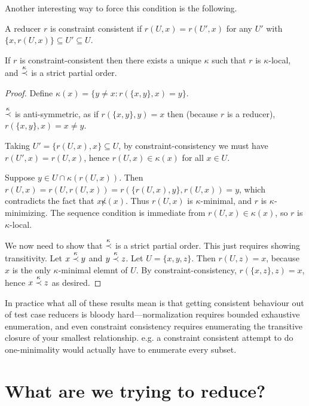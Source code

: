 Another interesting way to force this condition is the following.

\begin{definition}
A reducer \(r\) is constraint consistent if \(r(U, x) = r(U', x)\) for any \(U'\) with \(\{x, r(U, x)\} \subseteq U' \subseteq U\).
\end{definition}

\begin{theorem}
If \(r\) is constraint-consistent then there exists a unique \(\kappa\) such that \(r\) is \(\kappa\)-local,
and \(\stackrel{\kappa}{\prec}\) is a strict partial order.
\end{theorem}

\begin{proof}
Define \(\kappa(x) = \{y \neq x: r(\{x, y\}, x) = y\}\).

\(\stackrel{\kappa}{\prec}\) is anti-symmetric,
as if \(r(\{x, y\}, y) = x\) then (because \(r\) is a reducer),
\(r(\{x, y\}, x) = x \neq y\).

Taking \(U' = \{r(U, x), x\} \subseteq U\),
by constraint-consistency we must have \(r(U', x) = r(U, x)\),
hence \(r(U, x) \in \kappa(x)\) for all \(x \in U\).

Suppose \(y \in U \cap \kappa(r(U, x))\).
Then \(r(U, x) = r(U, r(U, x)) = r(\{r(U, x), y\}, r(U, x)) = y\),
which contradicts the fact that \(x \not \kappa(x)\).
Thus \(r(U, x)\) is \(\kappa\)-minimal,
and \(r\) is \(\kappa\)-minimizing.
The sequence condition is immediate from \(r(U, x) \in \kappa(x)\),
so \(r\) is \(\kappa\)-local.

We now need to show that \(\stackrel{\kappa}{\prec}\) is a strict partial order.
This just requires showing transitivity.
Let \(x \stackrel{\kappa}{\prec} y\) and \(y \stackrel{\kappa}{\prec} z\).
Let \(U = \{x, y, z\}\).
Then \(r(U, z) = x\), because \(x\) is the only \(\kappa\)-minimal elemnt of \(U\).
By constraint-consistency,
\(r(\{x, z\}, z) = x\),
hence \(x \stackrel{\kappa}{\prec} z\) as desired.
\end{proof}

In practice what all of these results mean is that getting consistent behaviour out of test case reducers is bloody hard---normalization
requires bounded exhaustive enumeration,
and even constraint consistency requires enumerating the transitive closure of your smallest relationship.
e.g. a constraint consistent attempt to do one-minimality would actually have to enumerate every subset.

\section{What are we trying to reduce?}

